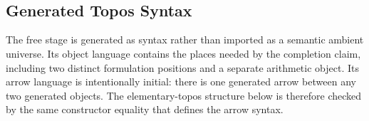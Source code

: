 \documentclass[11pt]{article}
\begin{document}
\begin{code}
%
\>[2]\AgdaSpace{}%
\<%
\\
\>[2][@{}l@{\AgdaIndent{0}}]%
\>[4]\AgdaSymbol{(}\AgdaSpace{}%
\AgdaSymbol{)}\<%
\\
%
\>[4]\AgdaSymbol{(}\AgdaSpace{}%
\AgdaSymbol{)}\<%
\\
\>[0]\AgdaSpace{}%
\AgdaSpace{}%
\AgdaSpace{}%
\AgdaSymbol{=}\<%
\\
\>[0][@{}l@{\AgdaIndent{0}}]%
\>[2]\<%
\\
\>[2][@{}l@{\AgdaIndent{0}}]%
\>[4]\AgdaSymbol{(}\<%
\\
\>[4][@{}l@{\AgdaIndent{0}}]%
\>[6]\AgdaSymbol{(}\AgdaSpace{}%
\AgdaSymbol{)}\<%
\\
%
\>[6]\AgdaSymbol{(}\AgdaSpace{}%
\AgdaSymbol{(}\AgdaSpace{}%
\AgdaSymbol{)))}\<%
\end{code}

\subsection{Generated Topos Syntax}

The free stage is generated as syntax rather than imported as a semantic
ambient universe.  Its object language contains the places needed by the
completion claim, including two distinct formulation positions and a
separate arithmetic object.  Its arrow language is intentionally initial:
there is one generated arrow between any two generated objects.  The
elementary-topos structure below is therefore checked by the same
constructor equality that defines the arrow syntax.
\end{document}
